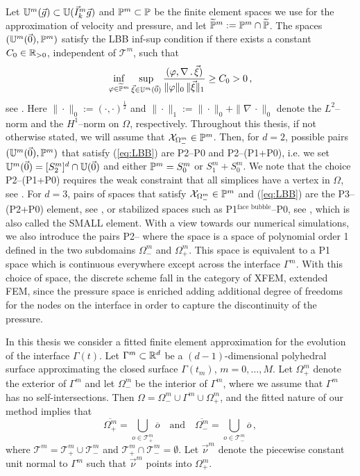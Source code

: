 Let $\uspacedisc{g}{m}\subset\uspacesimple(\vec I_k^m\vec g)$ and
$\pspace^m\subset\pspace$ be the finite element spaces we use for the
approximation of velocity and pressure, and let $\pnormspace^m:= \pspace^m \cap
\pnormspace$. The spaces $(\uspacedisc{0}{m},\pspace^m)$ satisfy the LBB
inf-sup condition if there exists a constant $C_0 \in \R_{>0}$, independent of
$\mathcal{T}^m$, such that
\begin{equation} \label{eq:LBB}
\inf_{\varphi \in \pnormspace^m} \sup_{\vec \xi \in \uspacedisc{0}{m}}
\frac{( \varphi, \nabla \,.\,\vec \xi)} {\|\varphi\|_0\,\|\vec \xi\|_1}
\geq C_0 > 0\,,
\end{equation}
see \cite[p.~114]{GiraultR86}. Here $\|\cdot\|_0 := (\cdot,\cdot)^\frac12$ and
$\|\cdot\|_1 := \|\cdot\|_0 + \|\nabla\,\cdot\|_0$ denote the $L^2$--norm and
the $H^1$--norm on $\Omega$, respectively. Throughout this thesis, if not
otherwise stated, we will assume that $\charfcn{\Omega^m_-}\in\pspace^m$. Then,
for $d=2$, possible pairs $(\uspacedisc{0}{m},\pspace^m)$ that satisfy
(\ref{eq:LBB}) are P2--P0 and P2--(P1+P0), i.e. we set
$\uspacedisc{0}{m}=[S^m_2]^d\cap\uspace{0}$ and either $\pspace^m = S^m_0$ or
$S^m_1+S^m_0$. We note that the choice P2--(P1+P0) requires the weak constraint
that all simplices have a vertex in $\Omega$, see \cite{BoffiCGG12}. For $d=3$,
pairs of spaces that satisfy $\charfcn{\Omega^m_-}\in\pspace^m$ and
(\ref{eq:LBB}) are the P3--(P2+P0) element, see \cite{BoffiCGG12}, or stabilized
spaces such as P1$^{\mbox{face bubble}}$--P0, see
\cite[Remark~8.7.1]{BoffiBF13}, which is also called the SMALL element. With a
view towards our numerical simulations, we also introduce the pairs P2--\pdg
where the space \pdg is a space of polynomial order 1 defined in the two
subdomains $\Omega_-^m$ and $\Omega_+^m$. This space is equivalent to a P1 space
which is continuous everywhere except across the interface $\Gamma^m$. With this
choice of space, the discrete scheme fall in the category of XFEM, extended
FEM, since the pressure space is enriched adding additional degree of freedoms
for the nodes on the interface in order to capture the discontinuity of the
pressure.

In this thesis we consider a fitted finite element approximation for the
evolution of the interface $\Gamma(t)$. Let $\Gamma^m\subset\R^d$ be a
$(d-1)$-dimensional polyhedral surface approximating the closed surface
$\Gamma(t_m)$, $m=0 ,\ldots, M$. Let $\Omega^m_+$ denote the exterior of
$\Gamma^m$ and let $\Omega^m_-$ be the interior of $\Gamma^m$, where we assume
that $\Gamma^m$ has no self-intersections. Then
$\Omega = \Omega_-^m \cup \Gamma^m \cup \Omega_+^m$, and the fitted nature of
our method implies that
\begin{equation} \label{eq:fittedO}
\overline{\Omega^m_+} = \bigcup_{o \in \mathcal{T}^m_+} \overline{o}
\quad\text{and}\quad
\overline{\Omega^m_-} = \bigcup_{o \in \mathcal{T}^m_-} \overline{o} \,,
\end{equation}
where $\mathcal{T}^m = \mathcal{T}^m_+ \cup \mathcal{T}^m_-$ and
$\mathcal{T}^m_+ \cap \mathcal{T}^m_- = \emptyset$.
Let $\vec \nu^m$ denote the piecewise constant unit normal to $\Gamma^m$
such that $\vec\nu^m$ points into $\Omega^m_+$.

